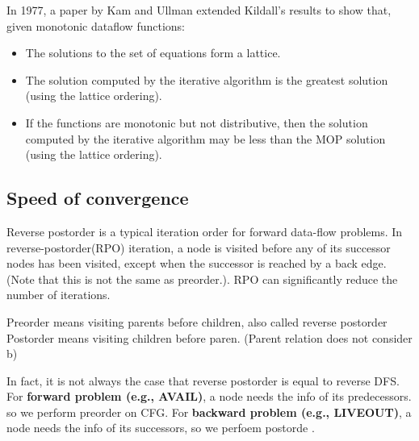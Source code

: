 In 1977, a paper by Kam and Ullman\cite{kam1977monotone}
extended Kildall's results to show that, given monotonic dataflow functions:

\begin{itemize}
	\item The solutions to the set of equations form a lattice.
	\item The solution computed by the iterative algorithm is the greatest solution (using the lattice ordering).
	\item If the functions are monotonic but not distributive, then the solution computed by the iterative algorithm may be less than the MOP solution (using the lattice ordering).
\end{itemize}



\subsection{Speed of convergence}

Reverse postorder is a typical iteration order for forward data-flow problems.
In reverse-postorder(RPO) iteration, a node is visited before any of its successor nodes has been visited,
except when the successor is reached by a back edge. (Note that this is not the same as preorder.). RPO can
significantly reduce the number of iterations.


Preorder means visiting parents before children, also called reverse postorder
Postorder means visiting children before paren. (Parent relation does not consider b)

In fact, it is not always the case that reverse postorder is equal to reverse DFS.
For \textbf{forward problem (e.g., AVAIL)}, a node needs the info of its predecessors.
so we perform preorder on CFG.
For \textbf{backward problem (e.g., LIVEOUT)},
a node needs the info of its successors, so we perfoem postorde .





